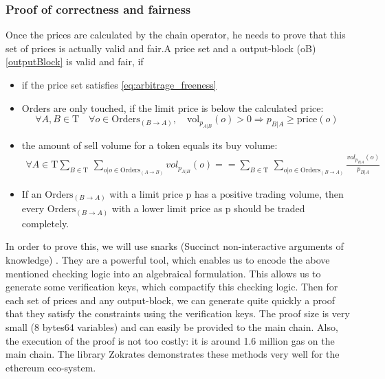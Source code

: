 \documentclass[11pt,parskip=full]{scrartcl}%
\newcommand{\Tau}{\mathrm{T}}
\begin{document}
\subsubsection{Proof of correctness and fairness}
Once the prices are calculated by the chain operator, he needs to prove that this set of prices is actually valid and fair.A price set and a output-block (oB) \ref{outputBlock} is valid and fair, if
\begin{itemize}

\item if the price set satisfies \ref{eq:arbitrage_freeness} 
\item Orders are only touched, if the limit price is below the calculated price:\newline
\begin{equation} \forall A,B \in \Tau \quad \forall o \in \text{Orders}_{(B\rightarrow A)}, \quad \text{vol}_{p_{A|B}}(o)>0 \Rightarrow p_{B|A}\geq \text{price}(o)
\end{equation}
\item the amount of sell volume for a token equals its buy volume: 
\begin{equation}
\begin{split}
\forall A \in \Tau \sum_{B\in \Tau} \,
\sum_{o| o\in \text{Orders}_{(A\rightarrow B)}} vol_{p_{A|B}}(o) == \sum_{B\in \Tau} \, \sum_{o| o\in \text{Orders}_{(B\rightarrow A)}} \frac{vol_{p_{B|A}}(o)}{p_{B|A}}
\end{split}
\end{equation}
\item If an $\text{Orders}_{(B\rightarrow A)}$ with a limit price p has a positive trading volume, then every $\text{Orders}_{(B\rightarrow A)}$ with a lower limit price as p should be traded completely. 
\end{itemize}

In order to prove this, we will use snarks (Succinct non-interactive arguments of knowledge) \cite{snarks}. 
They are a powerful tool, which enables us to encode the above mentioned checking logic into an algebraical formulation. 
This allows us to generate some verification keys, which compactify this checking logic. 
Then for each set of prices and any output-block, we can generate quite quickly a proof that they satisfy the constraints using the verification keys. 
The proof size is very small (8 bytes64 variables) and can easily be provided to the main chain. 
Also, the execution of the proof is not too costly: it is around 1.6 million gas on the main chain. 
The library Zokrates demonstrates these methods very well for the ethereum eco-system. 
\end{document}
